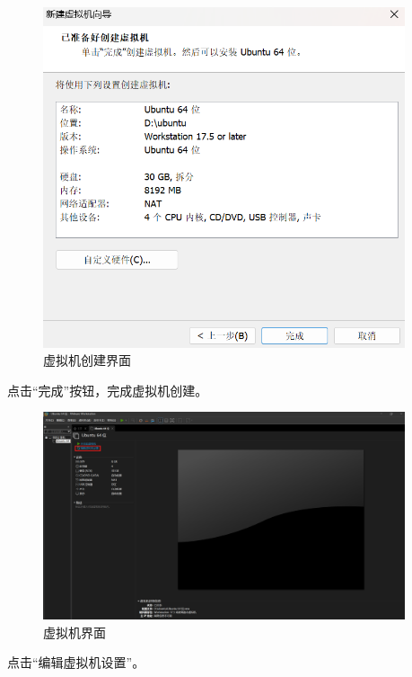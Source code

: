 \documentclass[UTF8]{ctexart}
\begin{document}
\begin{figure}[H]
    \centering
    \includegraphics[width=0.95\textwidth]{picture/Screenshot 2024-10-14 113721.png}
    \caption{虚拟机创建界面}
\end{figure}
点击“完成”按钮，完成虚拟机创建。

\begin{figure}[H]
    \centering
    \includegraphics[width=0.95\textwidth]{picture/Screenshot 2024-10-14 113849.png}
    \caption{虚拟机界面}
\end{figure}
点击“编辑虚拟机设置”。
\end{document}
